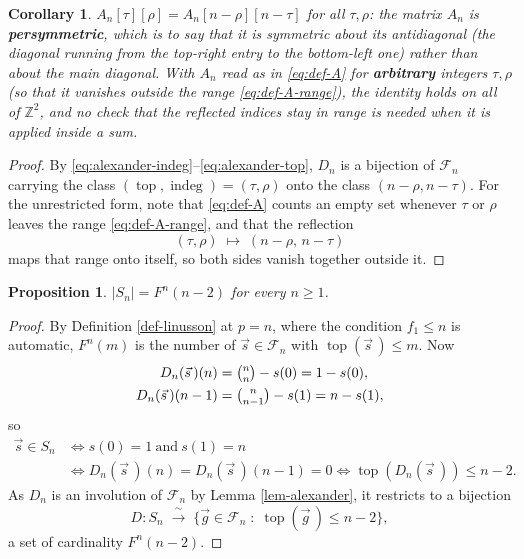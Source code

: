 \documentclass[11pt, a4paper, abstract=yes]{scrartcl}
\theoremstyle{definition}
\theoremstyle{remark}
\theoremstyle{plain}
\newtheorem{proposition}[definition]{Proposition}
\newtheorem{corollary}[definition]{Corollary}
\newcommand{\indeg}{\operatorname{indeg}}
\newcommand{\tp}{\operatorname{top}}
\begin{document}
\begin{corollary}
\(A_n[\tau][\rho]=A_n[n-\rho][n-\tau]\) for all \(\tau,\rho\): the matrix \(A_n\) is \textbf{persymmetric}, which
is to say that it is symmetric about its antidiagonal (the diagonal running from the top-right entry
to the bottom-left one) rather than about the main diagonal. With
\(A_n\) read as in \eqref{eq:def-A} for \textbf{arbitrary} integers \(\tau,\rho\) (so that it vanishes
outside the range \eqref{eq:def-A-range}), the identity holds on all of \(\mathbb Z^2\), and no
check that the reflected indices stay in range is needed when it is applied inside a sum.
\label{cor-persymmetry}
\end{corollary}

\begin{proof}
By \eqref{eq:alexander-indeg}--\eqref{eq:alexander-top}, \(D_n\) is a bijection of \(\mathcal F_n\) carrying the class
\((\tp,\indeg)=(\tau,\rho)\) onto the class \((n-\rho,n-\tau)\). For the unrestricted form, note that
\eqref{eq:def-A} counts an empty set whenever \(\tau\) or \(\rho\) leaves the range
\eqref{eq:def-A-range}, and that the reflection
\begin{equation}\label{eq:persymmetry-reflection}
  (\tau,\rho)\;\longmapsto\;(n-\rho,\,n-\tau)
\end{equation}
maps that range onto itself, so both sides vanish together outside it.
\end{proof}

\begin{proposition}
\(\lvert S_n\rvert=F^n(n-2)\) for every \(n\ge1\).
\label{prop-fnn2}
\end{proposition}

\begin{proof}
By Definition \ref{def-linusson} at \(p=n\), where the condition \(f_1\le n\) is automatic,
\(F^n(m)\) is the number of \(\vec s\in\mathcal F_n\) with \(\tp(\vec s\,)\le m\). Now
\begin{align}
  D_n(\vec s\,)(n)   &= \tbinom nn-s(0) = 1-s(0) ,\label{eq:D-top}\\
  D_n(\vec s\,)(n-1) &= \tbinom n{n-1}-s(1) = n-s(1) ,\label{eq:D-next}
\end{align}
so
\begin{align*}
  \vec s\in S_n
  &\iff s(0)=1\ \text{and}\ s(1)=n\\
  &\iff D_n(\vec s\,)(n)=D_n(\vec s\,)(n-1)=0
   \iff \tp(D_n(\vec s\,))\le n-2 .
\end{align*}
As \(D_n\) is an involution of \(\mathcal F_n\) by Lemma \ref{lem-alexander}, it restricts to a bijection
\begin{equation}\label{eq:Sn-bijection}
  D\colon S_n\;\xrightarrow{\ \sim\ }\;\bigl\lbrace\vec g\in\mathcal F_n\;:\;\tp(\vec g\,)\le n-2\bigr\rbrace ,
\end{equation}
a set of cardinality \(F^n(n-2)\).
\end{proof}
\end{document}
